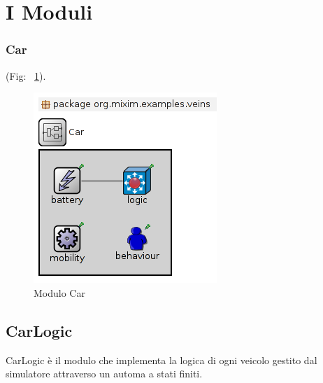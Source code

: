 
\section{I Moduli}

\subsubsection{Car}

(Fig: ~\ref{fig:module-car}).

\begin{figure}[H]
\centering
\includegraphics[scale=0.5]{assets/module-car.png}
\caption{Modulo Car}
\label{fig:module-car}
\end{figure}


\subsection{CarLogic}

CarLogic è il modulo che implementa la logica di ogni veicolo gestito dal simulatore attraverso un automa a stati finiti. 


